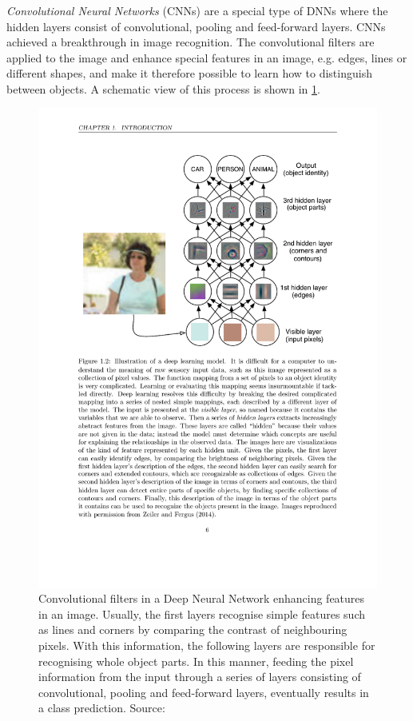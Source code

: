\textit{Convolutional Neural Networks} (CNNs) \cite{krizhevsky_imagenet_2017} are a special type of DNNs where the hidden layers consist of convolutional, pooling and feed-forward layers. CNNs achieved a breakthrough in image recognition. The convolutional filters are applied to the image and enhance special features in an image, e.g. edges, lines or different shapes, and make it therefore possible to learn how to distinguish between objects. A schematic view of this process is shown in \cref{fig:cnn_features}.

\begin{figure}
    \centering
    \includegraphics[width=0.7 \textwidth]{images/cnn_features.pdf}
    \caption{Convolutional filters in a Deep Neural Network enhancing features in an image. Usually, the first layers recognise simple features such as lines and corners by comparing the contrast of neighbouring pixels. With this information, the following layers are responsible for recognising whole object parts. In this manner, feeding the pixel information from the input through a series of layers consisting of convolutional, pooling and feed-forward layers, eventually results in a class prediction. Source: \cite{goodfellow_deep_2016}}
    \label{fig:cnn_features}
\end{figure}

